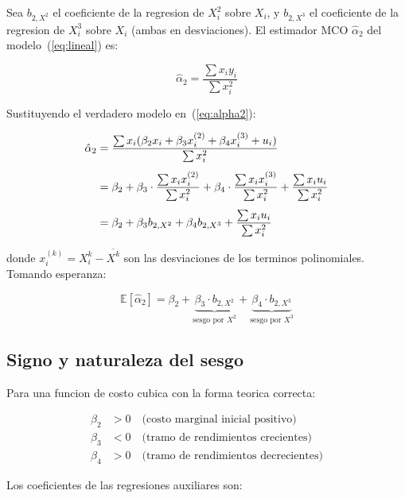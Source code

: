 \documentclass[12pt, letterpaper]{article}
\theoremstyle{remark}
\newcommand{\E}{\mathbb{E}}
\begin{document}
Sea $b_{2,X^2}$ el coeficiente de la regresion de $X_i^2$ sobre $X_i$, y
$b_{2,X^3}$ el coeficiente de la regresion de $X_i^3$ sobre $X_i$ (ambas en
desviaciones). El estimador MCO $\hat\alpha_2$ del modelo~(\ref{eq:lineal}) es:

\begin{equation}
  \hat\alpha_2 = \frac{\sum x_i y_i}{\sum x_i^2}
  \label{eq:alpha2}
\end{equation}

Sustituyendo el verdadero modelo en~(\ref{eq:alpha2}):

\begin{align}
  \hat\alpha_2
  &= \frac{\sum x_i (\beta_2 x_i + \beta_3 x_i^{(2)} + \beta_4 x_i^{(3)} + u_i)}
          {\sum x_i^2}
  \notag\\[4pt]
  &= \beta_2 + \beta_3 \cdot \frac{\sum x_i x_i^{(2)}}{\sum x_i^2}
            + \beta_4 \cdot \frac{\sum x_i x_i^{(3)}}{\sum x_i^2}
            + \frac{\sum x_i u_i}{\sum x_i^2}
  \notag\\[4pt]
  &= \beta_2 + \beta_3 b_{2,X^2} + \beta_4 b_{2,X^3} + \frac{\sum x_i u_i}{\sum x_i^2}
  \label{eq:alpha2_descomp}
\end{align}

donde $x_i^{(k)} = X_i^k - \overline{X^k}$ son las desviaciones de los
terminos polinomiales. Tomando esperanza:

\begin{equation}
  \boxed{
    \E[\hat\alpha_2]
      = \beta_2
        + \underbrace{\beta_3 \cdot b_{2,X^2}}_{\text{sesgo por } X^2}
        + \underbrace{\beta_4 \cdot b_{2,X^3}}_{\text{sesgo por } X^3}
  }
  \label{eq:sesgo_total}
\end{equation}

\subsection{Signo y naturaleza del sesgo}

Para una funcion de costo cubica con la forma teorica correcta:

\begin{align}
  \beta_2 &> 0 \quad \text{(costo marginal inicial positivo)}\\
  \beta_3 &< 0 \quad \text{(tramo de rendimientos crecientes)}\\
  \beta_4 &> 0 \quad \text{(tramo de rendimientos decrecientes)}
\end{align}

Los coeficientes de las regresiones auxiliares son:
\end{document}
